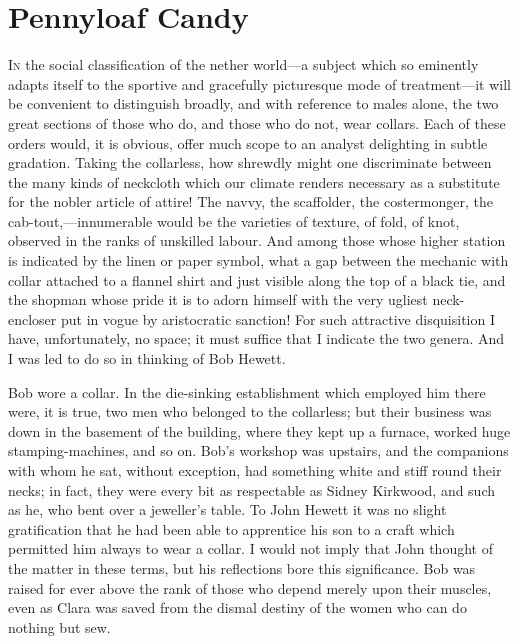 \chapter{Pennyloaf Candy}

\textsc{In} the social classification of the nether world---a subject
which so eminently adapts itself to the sportive and gracefully
picturesque mode of treatment---it will be convenient to distinguish
broadly, and with reference to males alone, the two great sections of
those who do, and those who do not, wear collars. Each of these orders
would, it is obvious, offer much scope to an analyst delighting in
subtle gradation. Taking the collarless, how shrewdly might one
discriminate between the many kinds of neckcloth which our climate
renders necessary as a substitute for the nobler article of attire! The
navvy, the scaffolder, the costermonger, the cab-tout,---innumerable
would be the varieties of texture, of fold, of knot, observed in the
ranks of {\protect\hypertarget{167}{}{}}unskilled labour. And among
those whose higher station is indicated by the linen or paper symbol,
what a gap between the mechanic with collar attached to a flannel shirt
and just visible along the top of a black tie, and the shopman whose
pride it is to adorn himself with the very ugliest neck-encloser put in
vogue by aristocratic sanction! For such attractive disquisition I have,
unfortunately, no space; it must suffice that I indicate the two genera.
And I was led to do so in thinking of Bob Hewett.

Bob wore a collar. In the die-sinking establishment which employed him
there were, it is true, two men who belonged to the collarless; but
their business was down in the basement of the building, where they kept
up a furnace, worked huge stamping-machines, and so on. Bob's workshop
was upstairs, and the companions with whom he sat, without exception,
had something white and stiff round their necks; in fact, they were
every bit as respectable as Sidney Kirkwood, and such as he, who bent
over a {\protect\hypertarget{168}{}{}}jeweller's table. To John Hewett
it was no slight gratification that he had been able to apprentice his
son to a craft which permitted him always to wear a collar. I would not
imply that John thought of the matter in these terms, but his
reflections bore this significance. Bob was raised for ever above the
rank of those who depend merely upon their muscles, even as Clara was
saved from the dismal destiny of the women who can do nothing but sew.

